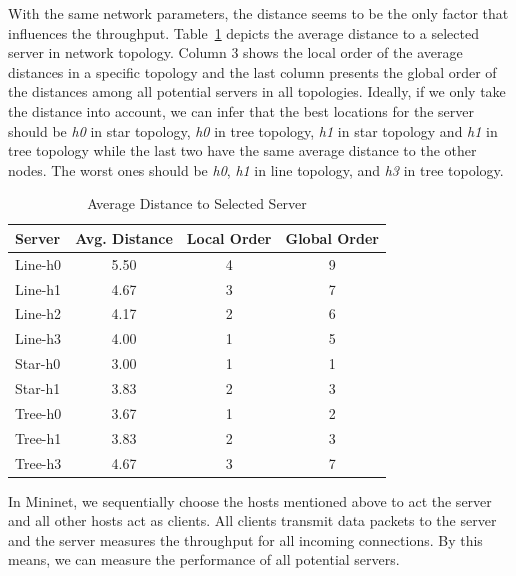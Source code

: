 With the same network parameters, the distance seems to be the only factor that 
influences the throughput. 
Table~\ref{table:distance} depicts the average distance to 
a selected server in network topology. Column 3 shows the local order
of the average distances in a specific topology and the last 
column presents the global order of the distances among all 
potential servers in all topologies. 
Ideally, if we only take the distance into account, 
we can infer that the best locations for the server should be {\it h0} 
in star topology, {\it h0} in tree topology, {\it h1} in star topology and 
{\it h1} in tree topology while the last two have the same average distance
to the other nodes. The worst ones should be {\it h0}, {\it h1} in line topology, 
and {\it h3} in tree topology.

\begin{table}[ht]
\centering
	\caption{Average Distance to Selected Server}
	\label{table:distance}
	\begin{tabular}{|l||c|c|c|}
		\hline 
		Server   &  Avg. Distance & Local Order & Global Order \\ \hline\hline
		Line-h0  &   5.50  &  4   &  9 \\ \hline 
		Line-h1  &   4.67  &  3   &  7 \\ \hline 
		Line-h2  &   4.17  &  2   &  6 \\ \hline 
		Line-h3  &   4.00  &  1   &  5 \\ \hline\hline 
		Star-h0  &   3.00  &  1   &  1 \\ \hline 
        Star-h1  &   3.83  &  2   &  3 \\ \hline\hline 
		Tree-h0  &   3.67  &  1   &  2 \\ \hline 
		Tree-h1  &   3.83  &  2   &  3 \\ \hline 
		Tree-h3  &   4.67  &  3   &  7 \\ \hline 
	\end{tabular}
\end{table}

In Mininet, we sequentially choose the hosts mentioned above 
to act the server and all other hosts act as clients. All clients transmit
data packets to the server and the server measures the throughput for all 
incoming connections. By this means, we can measure the performance of 
all potential servers. 